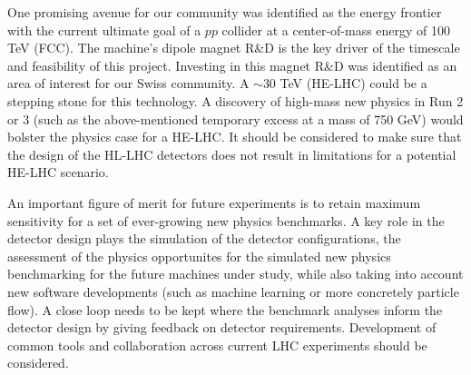 One promising avenue for our community was identified as the energy frontier with the current ultimate goal of a $pp$ collider at a center-of-mass energy of 100 TeV (FCC).  The machine's dipole magnet R\&D is the key driver of the timescale and feasibility of this project.  Investing in this magnet R\&D was identified as an area of interest for our Swiss community.  A $\sim30$ TeV (HE-LHC) could be a stepping stone for this technology.  A discovery of high-mass new physics in Run 2 or 3 (such as the above-mentioned temporary excess at a mass of 750 GeV) would bolster the physics case for a HE-LHC. It should be considered to make sure that the design of the HL-LHC detectors does not result in limitations for a potential HE-LHC scenario.

An important figure of merit for future experiments is to retain maximum sensitivity for a set of ever-growing new physics benchmarks.  A key role in the detector design plays the simulation of the detector configurations, the assessment of the physics opportunites for the simulated new physics benchmarking for the future machines under study, while also taking into account new software developments (such as machine learning or more concretely particle flow).  A close loop needs to be kept where the benchmark analyses inform the detector design by giving feedback on detector requirements.  Development of common tools and collaboration across current LHC experiments should be considered.


